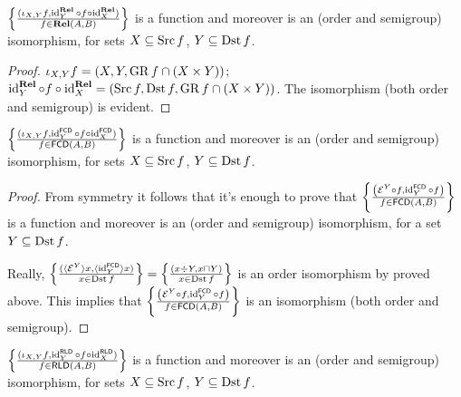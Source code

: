 \begin{prop}
  $\left\{ \frac{ (\iota_{X, Y} f , \operatorname{id}^{\mathbf{Rel}}_Y \circ f \circ
  \operatorname{id}^{\mathbf{Rel}}_X) }{ f \in
  \mathbf{Rel} (A , B) }\right\}$ is a function and moreover is an
  (order and semigroup) isomorphism, for sets $X \subseteq \operatorname{Src} f$, $Y
  \subseteq \operatorname{Dst} f$.
\end{prop}

\begin{proof}
  $\iota_{X, Y} f = (X , Y , \operatorname{GR} f \cap (X \times Y))$;
  $\operatorname{id}^{\mathbf{Rel}}_Y \circ f \circ
  \operatorname{id}^{\mathbf{Rel}}_X = (\operatorname{Src} f , \operatorname{Dst} f ,
  \operatorname{GR} f \cap (X \times Y))$. The isomorphism (both order and semigroup)
  is evident.
\end{proof}

\begin{prop}
  $\left\{ \frac{ (\iota_{X, Y} f , \operatorname{id}^{\mathsf{FCD}}_Y
  \circ f \circ \operatorname{id}^{\mathsf{FCD}}_X) }{
  f \in \mathsf{FCD} (A , B) }\right\}$ is a function and moreover is an
  (order and semigroup) isomorphism, for sets $X \subseteq \operatorname{Src} f$, $Y
  \subseteq \operatorname{Dst} f$.
\end{prop}

\begin{proof}
  From symmetry it follows that it's enough to prove that $\left\{ \frac{ \left(
  \mathcal{E}^Y \circ f , \operatorname{id}^{\mathsf{FCD}}_Y \circ f \right)
  }{ f \in \mathsf{FCD} (A , B) }\right\}$ is a
  function and moreover is an (order and semigroup) isomorphism, for a set $Y
  \subseteq \operatorname{Dst} f$.
  
  Really, $\left\{ \frac{ (\langle \mathcal{E}^Y \rangle x , \langle
  \operatorname{id}^{\mathsf{FCD}}_Y \rangle x) }{ x
  \in \operatorname{Dst} f }\right\} = \left\{ \frac{ (x \div Y , x \sqcap Y) }{
  x \in \operatorname{Dst} f }\right\}$ is an order isomorphism by proved
  above. This implies that $\left\{ \frac{ \left( \mathcal{E}^Y \circ f ,
  \operatorname{id}^{\mathsf{FCD}}_Y \circ f \right) }{
  f \in \mathsf{FCD} (A , B) }\right\}$ is an isomorphism
  (both order and semigroup).
\end{proof}

\begin{prop}
  $\left\{ \frac{ (\iota_{X, Y} f , \operatorname{id}^{\mathsf{RLD}}_Y \circ f \circ
  \operatorname{id}^{\mathsf{RLD}}_X) }{ f \in
  \mathsf{RLD} (A , B) }\right\}$ is a function and moreover is an
  (order and semigroup) isomorphism, for sets $X \subseteq \operatorname{Src} f$, $Y
  \subseteq \operatorname{Dst} f$.
\end{prop}

